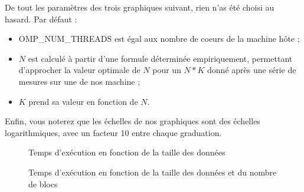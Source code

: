 \documentclass[12pt]{article}
\begin{document}
De tout les paramètres des trois graphiques suivant, rien n'as été choisi au
hasard. Par défaut :
\begin{itemize}
        \item OMP\_NUM\_THREADS est égal aux nombre de coeurs de la machine hôte ;
        \item $N$ est calculé à partir d'une formule déterminée empiriquement,
            permettant d'approcher la valeur optimale de $N$ pour un $N*K$ donné
            après une série de mesures sur une de nos machine ;
        \item $K$ prend sa valeur en fonction de $N$.
\end{itemize}

Enfin, vous noterez que les échelles de nos graphiques sont des échelles
logarithmiques, avec un facteur 10 entre chaque graduation. 

\begin{figure}
    \begin{center}
        \caption{Temps d'exécution en fonction de la taille des données}
        \label{time-to-data-size}
    \end{center}
\end{figure}

\begin{figure}
    \begin{center}
        \caption{Temps d'exécution en fonction de la taille des données et du nombre de blocs}
        \label{time-to-data-size-and-blocks}
    \end{center}
\end{figure}
\end{document}
